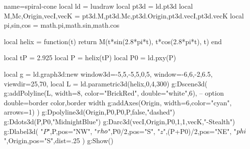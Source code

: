\documentclass{standalone}
\begin{document}
\begin{luadraw}{name=spiral-cone}
local ld = luadraw
local pt3d = ld.pt3d
local M,Mc,Origin,vecI,vecK = pt3d.M,pt3d.Mc,pt3d.Origin,pt3d.vecI,pt3d.vecK
local pi,sin,cos = math.pi,math.sin,math.cos

local helix = function(t)
  return M(t*sin(2.8*pi*t), t*cos(2.8*pi*t), t)
end

local tP = 2.925
local P = helix(tP)
local P0 = ld.pxy(P)

local g = ld.graph3d:new{
  window3d={-5,5,-5,5,0,5},
  window={-6,6,-2,6.5},
  viewdir={25,70},
}
local L = ld.parametric3d(helix,0,4,300)
g:Dscene3d(
    g:addPolyline(L, {width=8, color="BrickRed", double={"white",6}}), -- option double={border color,border width}
    g:addAxes(Origin, {width=6,color="cyan", arrows=1})
)
g:Dpolyline3d({{Origin,P0},{P0,P}},false,"dashed")
g:Ddots3d({P,P0},"MidnightBlue")
g:Darc3d(vecI,Origin,P0,1,1,vecK,"-Stealth")
g:Dlabel3d(
    "$P$",P,{pos="NW"},
    "$\\rho$",P0/2,{pos="S"},
    "$z$",(P+P0)/2,{pos="NE"},
    "$\\phi$",Origin,{pos="S",dist=.25}
)
g:Show()
\end{luadraw}
\end{document}
